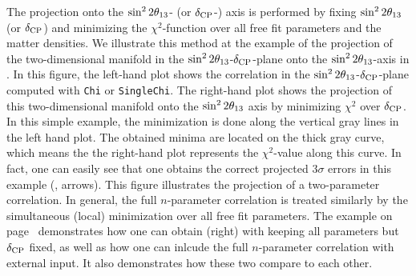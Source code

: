 The projection onto the $\sin^2 2 \theta_{13}$- (or $\delta_{\mathrm{CP}}$-) axis is performed by fixing $\sin^2 2 \theta_{13}$ (or $\delta_{\mathrm{CP}}$) and minimizing the $\chi^2$-function over all free fit parameters and the matter densities. We illustrate this method at the example of the projection of the two-dimensional manifold in the $\sin^2 2 \theta_{13}$-$\delta_{\mathrm{CP}}$-plane onto the $\sin^2 2 \theta_{13}$-axis in . In this figure, the left-hand plot shows the correlation in the $\sin^2 2 \theta_{13}$-$\delta_{\mathrm{CP}}$-plane computed with {\tt Chi} or {\tt SingleChi}. The right-hand plot shows the projection of this two-dimensional manifold onto the $\sin^2 2 \theta_{13}$ axis by minimizing $\chi^2$ over $\delta_{\mathrm{CP}}$. In this simple example, the minimization is done along the vertical gray lines in the left hand plot. The obtained minima are located on the thick gray curve, which means the the right-hand plot represents the $\chi^2$-value along this curve. In fact, one can easily see that one obtains the correct projected $3 \sigma$ errors in this example (\cf, arrows). This figure illustrates the projection of a two-parameter correlation. In general, the full $n$-parameter correlation is treated similarly by the simultaneous (local) minimization over all free fit parameters. The example on page~\pageref{ex:corrproj} demonstrates how one can obtain  (right) with keeping all parameters but $\delta_{\mathrm{CP}}$ fixed, as well as how one can inlcude the full $n$-parameter correlation with external input. It also demonstrates how these two compare to each other.

